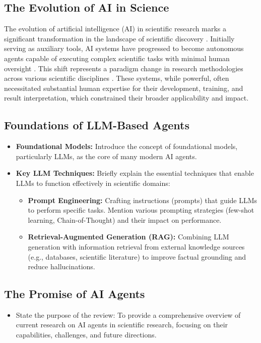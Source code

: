 \documentclass{article}
\begin{document}
\subsection{The Evolution of AI in Science}
The evolution of artificial intelligence (AI) in scientific research marks a significant 
transformation in the landscape of scientific discovery \cite{wang2023scientific}.
Initially serving as auxiliary tools, AI systems have progressed to become autonomous agents 
capable of executing complex scientific tasks with minimal human oversight \cite{boiko2023autonomous}.
This shift represents a paradigm change in research methodologies across various scientific disciplines
\cite{vamathevan2019applications, jordan2015machine,bifarin2021machine}. These systems, while powerful, 
often necessitated substantial human expertise for their development, training, and result interpretation, 
which constrained their broader applicability and impact.



\subsection{Foundations of LLM-Based Agents}
\begin{itemize}
    \item \textbf{Foundational Models:} Introduce the concept of foundational models, particularly LLMs, as the core of many modern AI agents.
    \item \textbf{Key LLM Techniques:} Briefly explain the essential techniques that enable LLMs to function effectively in scientific domains:
    \begin{itemize}
        \item \textbf{Prompt Engineering:} Crafting instructions (prompts) that guide LLMs to perform specific tasks. Mention various prompting strategies (few-shot learning, Chain-of-Thought) and their impact on performance.
        \item \textbf{Retrieval-Augmented Generation (RAG):} Combining LLM generation with information retrieval from external knowledge sources (e.g., databases, scientific literature) to improve factual grounding and reduce hallucinations.
    \end{itemize}
\end{itemize}

\subsection{The Promise of AI Agents}
\begin{itemize}
    \item State the purpose of the review: To provide a comprehensive overview of current research on AI agents in scientific research, focusing on their capabilities, challenges, and future directions.
\end{itemize}
\end{document}
